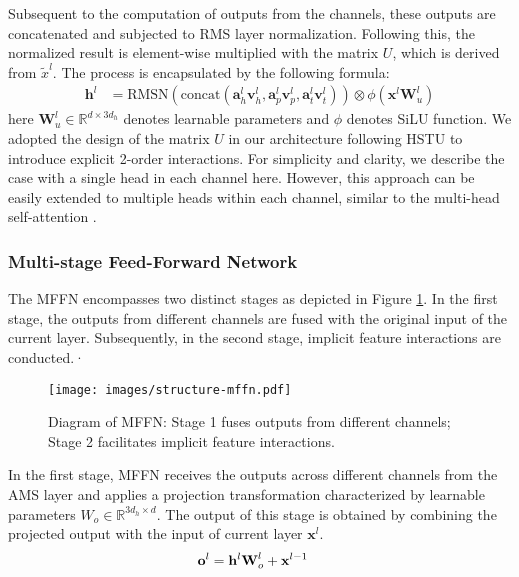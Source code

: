 Subsequent to the computation of outputs from the channels, these outputs are concatenated and subjected to RMS layer normalization. 
Following this, the normalized result is element-wise multiplied with the matrix $U$, which is derived from $\tilde{x}^l$. 
The process is encapsulated by the following formula:
\begin{align}
    \mathbf{h}^l &= \text{RMSN}(\text{concat}(\mathbf a^{l}_h \mathbf v^{l}_h, \mathbf a^{l}_p \mathbf v^{l}_p, \mathbf a^{l}_t \mathbf v^{l}_t)) \otimes \phi(\mathbf x^l \mathbf W_u^l)
\end{align}
here $\mathbf W_u^l \in \mathbb R^{d\times 3d_h}$ denotes learnable parameters and $\phi$ denotes SiLU function. We adopted the design of the matrix $U$ in our architecture following HSTU \cite{zhai2024actions} to introduce explicit 2-order interactions. 
For simplicity and clarity, we describe the case with a single head in each channel here. 
However, this approach can be easily extended to multiple heads within each channel, similar to the multi-head self-attention \cite{transformer}.

\subsubsection{Multi-stage Feed-Forward Network} The MFFN encompasses two distinct stages as depicted in Figure \ref{fig:structure-mffn}. 
In the first stage, the outputs from different channels are fused with the original input of the current layer. Subsequently, in the second stage, implicit feature interactions are conducted.·
\begin{figure}
    \centering
    \setlength{\abovecaptionskip}{0pt}
    \setlength{\belowcaptionskip}{-10pt}
    \texttt{[image: images/structure-mffn.pdf]}
    \caption{Diagram of MFFN: Stage 1 fuses outputs from different channels; Stage 2 facilitates implicit feature interactions.}
    \label{fig:structure-mffn}
\end{figure}

In the first stage, MFFN receives the outputs across different channels from the AMS layer and applies a projection transformation characterized by learnable parameters $W_o \in \mathbb R^{3d_h \times d}$. The output of this stage is obtained by combining the projected output with the input of current layer $\mathbf x^l$.
\begin{align}
    \mathbf o^{l} &= \mathbf{h}^l\textbf W_o^{l} + \mathbf x^{l-1}
\end{align}

